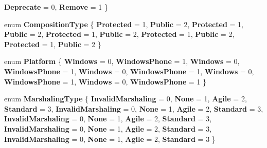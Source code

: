 \begin{DoxyCompactItemize}
{\bfseries Deprecate} = 0, 
{\bfseries Remove} = 1
 \}
\item 
\mbox{\label{namespace_windows_1_1_foundation_1_1_metadata_a505a6f2bc4b2b9794234c3c04a49dab7}} 
enum {\bfseries Composition\+Type} \{ \newline
{\bfseries Protected} = 1, 
{\bfseries Public} = 2, 
{\bfseries Protected} = 1, 
{\bfseries Public} = 2, 
\newline
{\bfseries Protected} = 1, 
{\bfseries Public} = 2, 
{\bfseries Protected} = 1, 
{\bfseries Public} = 2, 
\newline
{\bfseries Protected} = 1, 
{\bfseries Public} = 2
 \}
\item 
\mbox{\label{namespace_windows_1_1_foundation_1_1_metadata_ac74fec362ca55a3b5379960a1fde476d}} 
enum {\bfseries Platform} \{ \newline
{\bfseries Windows} = 0, 
{\bfseries Windows\+Phone} = 1, 
{\bfseries Windows} = 0, 
{\bfseries Windows\+Phone} = 1, 
\newline
{\bfseries Windows} = 0, 
{\bfseries Windows\+Phone} = 1, 
{\bfseries Windows} = 0, 
{\bfseries Windows\+Phone} = 1, 
\newline
{\bfseries Windows} = 0, 
{\bfseries Windows\+Phone} = 1
 \}
\item 
\mbox{\label{namespace_windows_1_1_foundation_1_1_metadata_af96a9466daa74933d167e8e5777f203f}} 
enum {\bfseries Marshaling\+Type} \{ \newline
{\bfseries Invalid\+Marshaling} = 0, 
{\bfseries None} = 1, 
{\bfseries Agile} = 2, 
{\bfseries Standard} = 3, 
\newline
{\bfseries Invalid\+Marshaling} = 0, 
{\bfseries None} = 1, 
{\bfseries Agile} = 2, 
{\bfseries Standard} = 3, 
\newline
{\bfseries Invalid\+Marshaling} = 0, 
{\bfseries None} = 1, 
{\bfseries Agile} = 2, 
{\bfseries Standard} = 3, 
\newline
{\bfseries Invalid\+Marshaling} = 0, 
{\bfseries None} = 1, 
{\bfseries Agile} = 2, 
{\bfseries Standard} = 3, 
\newline
{\bfseries Invalid\+Marshaling} = 0, 
{\bfseries None} = 1, 
{\bfseries Agile} = 2, 
{\bfseries Standard} = 3
 \}
\item 
\mbox{\label{namespace_windows_1_1_foundation_1_1_metadata_a4b7486fa60d9faccd8b65757f42b1aa1}} 

\end{DoxyCompactItemize}
